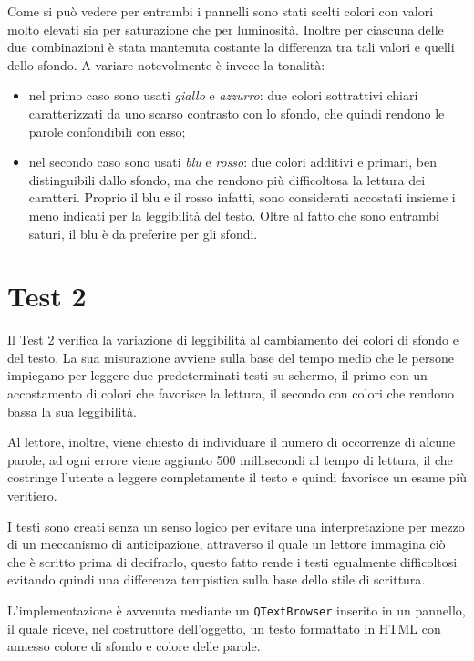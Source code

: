 \documentclass[a4paper]{article}
\begin{document}
Come si può vedere per entrambi i pannelli sono stati scelti colori con valori molto elevati sia per saturazione che per luminosità. Inoltre per ciascuna delle due combinazioni è stata mantenuta costante la differenza tra tali valori e quelli dello sfondo.
A variare notevolmente è invece la tonalità:
\begin{itemize}
\item nel primo caso sono usati \emph{giallo} e \emph{azzurro}: due colori sottrattivi chiari caratterizzati da uno scarso contrasto con lo sfondo, che quindi rendono le parole confondibili con esso;
\item nel secondo caso sono usati \emph{blu} e \emph{rosso}: due colori additivi e primari, ben distinguibili dallo sfondo, ma che rendono più difficoltosa la lettura dei caratteri. Proprio il blu e il rosso infatti, sono considerati accostati insieme i meno indicati per la leggibilità del testo. Oltre al fatto che sono entrambi saturi, il blu è da preferire per gli sfondi.
\end{itemize}

\section{Test 2}
Il Test 2 verifica la variazione di leggibilità al cambiamento dei colori di sfondo e del testo.
La sua misurazione avviene sulla base del tempo medio che le persone impiegano per leggere due predeterminati testi su schermo, il primo con un accostamento 
di colori che favorisce la lettura, il secondo con colori che rendono bassa la sua leggibilità.

Al lettore, inoltre, viene chiesto di individuare il numero di occorrenze di alcune parole, ad ogni errore viene aggiunto 500 millisecondi al tempo di lettura,
il che costringe l'utente a leggere completamente il testo e quindi favorisce un esame più veritiero.

I testi sono creati senza un senso logico per evitare una interpretazione per mezzo di un meccanismo di anticipazione, attraverso il quale
un lettore immagina ciò che è scritto prima di decifrarlo, questo fatto rende i testi egualmente difficoltosi 
evitando quindi una differenza tempistica sulla base dello stile di scrittura.

L'implementazione è avvenuta mediante un \verb:QTextBrowser: inserito in un pannello, il quale riceve, nel costruttore dell'oggetto, 
un testo formattato in HTML con annesso colore di sfondo e colore delle parole.
\end{document}
